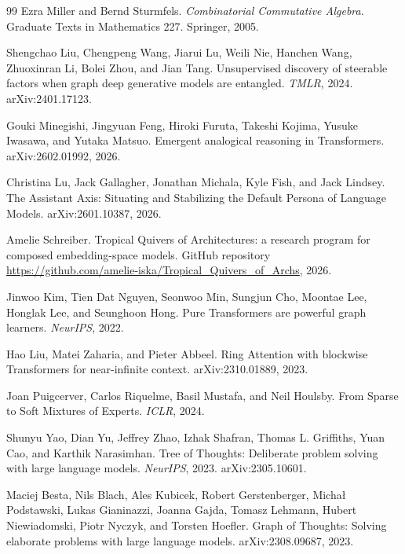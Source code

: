 \documentclass[10pt]{article}
\theoremstyle{definition}
\theoremstyle{plain}
\theoremstyle{remark}
\begin{document}
\begin{thebibliography}{99}
Ezra Miller and Bernd Sturmfels.
\newblock \emph{Combinatorial Commutative Algebra}.
\newblock Graduate Texts in Mathematics 227. Springer, 2005.

Shengchao Liu, Chengpeng Wang, Jiarui Lu, Weili Nie, Hanchen Wang, Zhuoxinran Li, Bolei Zhou, and Jian Tang.
\newblock Unsupervised discovery of steerable factors when graph deep generative models are entangled.
\newblock \emph{TMLR}, 2024. arXiv:2401.17123.

Gouki Minegishi, Jingyuan Feng, Hiroki Furuta, Takeshi Kojima, Yusuke Iwasawa, and Yutaka Matsuo.
\newblock Emergent analogical reasoning in Transformers.
\newblock arXiv:2602.01992, 2026.

Christina Lu, Jack Gallagher, Jonathan Michala, Kyle Fish, and Jack Lindsey.
\newblock The Assistant Axis: Situating and Stabilizing the Default Persona of Language Models.
\newblock arXiv:2601.10387, 2026.

Amelie Schreiber.
\newblock Tropical Quivers of Architectures: a research program for composed embedding-space models.
\newblock GitHub repository \url{https://github.com/amelie-iska/Tropical_Quivers_of_Archs}, 2026.

Jinwoo Kim, Tien Dat Nguyen, Seonwoo Min, Sungjun Cho, Moontae Lee, Honglak Lee, and Seunghoon Hong.
\newblock Pure Transformers are powerful graph learners.
\newblock \emph{NeurIPS}, 2022.

Hao Liu, Matei Zaharia, and Pieter Abbeel.
\newblock Ring Attention with blockwise Transformers for near-infinite context.
\newblock arXiv:2310.01889, 2023.

Joan Puigcerver, Carlos Riquelme, Basil Mustafa, and Neil Houlsby.
\newblock From Sparse to Soft Mixtures of Experts.
\newblock \emph{ICLR}, 2024.

Shunyu Yao, Dian Yu, Jeffrey Zhao, Izhak Shafran, Thomas L. Griffiths, Yuan Cao, and Karthik Narasimhan.
\newblock Tree of Thoughts: Deliberate problem solving with large language models.
\newblock \emph{NeurIPS}, 2023. arXiv:2305.10601.

Maciej Besta, Nils Blach, Ales Kubicek, Robert Gerstenberger, Micha\l{} Podstawski, Lukas Gianinazzi, Joanna Gajda, Tomasz Lehmann, Hubert Niewiadomski, Piotr Nyczyk, and Torsten Hoefler.
\newblock Graph of Thoughts: Solving elaborate problems with large language models.
\newblock arXiv:2308.09687, 2023.


\end{thebibliography}
\end{document}
